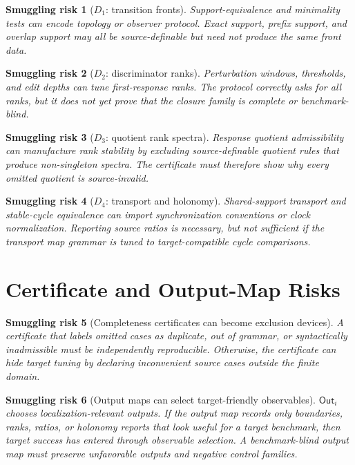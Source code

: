 \documentclass[11pt]{article}
\newcommand{\Out}{\mathsf{Out}}
\newtheorem{smugglingrisk}{Smuggling risk}
\begin{document}
\begin{smugglingrisk}[\(D_1\): transition fronts]
Support-equivalence and minimality tests can encode topology or observer
protocol. Exact support, prefix support, and overlap support may all be
source-definable but need not produce the same front data.
\end{smugglingrisk}

\begin{smugglingrisk}[\(D_2\): discriminator ranks]
Perturbation windows, thresholds, and edit depths can tune first-response
ranks. The protocol correctly asks for all ranks, but it does not yet prove
that the closure family is complete or benchmark-blind.
\end{smugglingrisk}

\begin{smugglingrisk}[\(D_3\): quotient rank spectra]
Response quotient admissibility can manufacture rank stability by excluding
source-definable quotient rules that produce non-singleton spectra. The
certificate must therefore show why every omitted quotient is source-invalid.
\end{smugglingrisk}

\begin{smugglingrisk}[\(D_4\): transport and holonomy]
Shared-support transport and stable-cycle equivalence can import
synchronization conventions or clock normalization. Reporting source ratios
is necessary, but not sufficient if the transport map grammar is tuned to
target-compatible cycle comparisons.
\end{smugglingrisk}

\section{Certificate and Output-Map Risks}

\begin{smugglingrisk}[Completeness certificates can become exclusion devices]
A certificate that labels omitted cases as duplicate, out of grammar, or
syntactically inadmissible must be independently reproducible. Otherwise,
the certificate can hide target tuning by declaring inconvenient source
cases outside the finite domain.
\end{smugglingrisk}

\begin{smugglingrisk}[Output maps can select target-friendly observables]
\(\Out_i\) chooses localization-relevant outputs. If the output map records
only boundaries, ranks, ratios, or holonomy reports that look useful for a
target benchmark, then target success has entered through observable
selection. A benchmark-blind output map must preserve unfavorable outputs
and negative control families.
\end{smugglingrisk}
\end{document}

